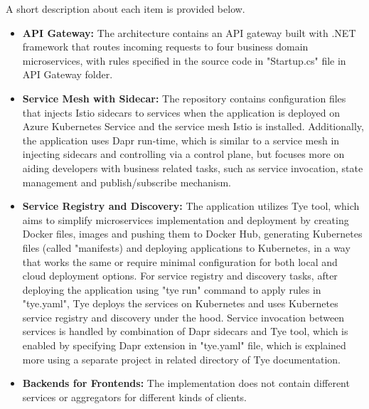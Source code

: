 \documentclass{Configuration_Files/PoliMi3i_thesis}
\begin{document}
A short description about each item is provided below.

\begin{itemize}
    \item \textbf{API Gateway:} The architecture contains an API gateway built with .NET framework that routes incoming requests to four business domain microservices, with rules specified in the source code in "Startup.cs" file in API Gateway folder.
    
    \item \textbf{Service Mesh with Sidecar:} The repository contains configuration files that injects Istio sidecars to services when the application is deployed on Azure Kubernetes Service and the service mesh Istio is installed.
    Additionally, the application uses Dapr run-time, which is similar to a service mesh in injecting sidecars and controlling via a control plane, but focuses more on aiding developers with business related tasks, such as service invocation, state management and publish/subscribe mechanism\footnotemark[97].
    
    \item \textbf{Service Registry and Discovery:} The application utilizes Tye tool, which aims to simplify microservices implementation and deployment by creating Docker files, images and pushing them to Docker Hub, generating Kubernetes files (called "manifests) and deploying applications to Kubernetes, in a way that works the same or require minimal configuration for both local and cloud deployment options\footnotemark[98].
    For service registry and discovery tasks, after deploying the application using "tye run" command to apply rules in "tye.yaml", Tye deploys the services on Kubernetes and uses Kubernetes service registry and discovery under the hood.
    Service invocation between services is handled by combination of Dapr sidecars and Tye tool, which is enabled by specifying Dapr extension in "tye.yaml" file, which is explained more using a separate project in related directory of Tye documentation\footnotemark[99].
    
    \item \textbf{Backends for Frontends:} The implementation does not contain different services or aggregators for different kinds of clients.
    

\end{itemize}
\end{document}
